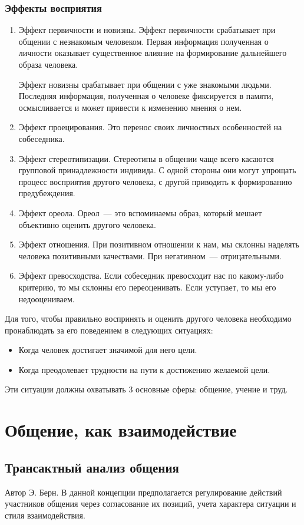 \subsubsection{Эффекты восприятия}
\begin{enumerate}
	\item Эффект первичности и новизны. Эффект первичности срабатывает при общении с незнакомым человеком. Первая информация полученная о личности оказывает существенное влияние на формирование дальнейшего образа человека.
	
	Эффект новизны срабатывает при общении с уже знакомыми людьми. Последняя информация, полученная о человеке фиксируется в памяти, осмысливается и может привести к изменению мнения о нем.
	\item Эффект проецирования. Это перенос своих личностных особенностей на собеседника.
	\item Эффект стереотипизации. Стереотипы в общении чаще всего касаются групповой принадлежности индивида. С одной стороны они могут упрощать процесс восприятия другого человека, с другой приводить к формированию предубеждения.
	\item Эффект ореола. Ореол~--- это вспоминаемы образ, который мешает объективно оценить другого человека.
	\item Эффект отношения. При позитивном отношении к нам, мы склонны наделять человека позитивными качествами. При негативном~--- отрицательными.
	\item Эффект превосходства. Если собеседник превосходит нас по какому-либо критерию, то мы склонны его переоценивать. Если уступает, то мы его недооцениваем.
\end{enumerate}

Для того, чтобы правильно воспринять и оценить другого человека необходимо пронаблюдать за его поведением в следующих ситуациях:
\begin{itemize}
	\item Когда человек достигает значимой для него цели.
	\item Когда преодолевает трудности на пути к достижению желаемой цели.
\end{itemize}

Эти ситуации должны охватывать 3 основные сферы: общение, учение и труд.

\section{Общение, как взаимодействие}
\subsection{Трансактный анализ общения}
Автор Э. Берн. В данной концепции предполагается регулирование действий участников общения через согласование их позиций, учета характера ситуации и стиля взаимодействия.

